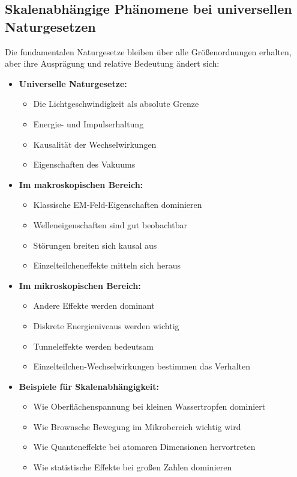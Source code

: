 \documentclass[12pt,a4paper]{article}
\begin{document}
	\subsection{Skalenabhängige Phänomene bei universellen Naturgesetzen}
	
	Die fundamentalen Naturgesetze bleiben über alle Größenordnungen erhalten, aber ihre Ausprägung und relative Bedeutung ändert sich:
	
	\begin{itemize}
		\item \textbf{Universelle Naturgesetze:}
		\begin{itemize}
			\item Die Lichtgeschwindigkeit als absolute Grenze
			\item Energie- und Impulserhaltung
			\item Kausalität der Wechselwirkungen
			\item Eigenschaften des Vakuums
		\end{itemize}
		
		\item \textbf{Im makroskopischen Bereich:}
		\begin{itemize}
			\item Klassische EM-Feld-Eigenschaften dominieren
			\item Welleneigenschaften sind gut beobachtbar
			\item Störungen breiten sich kausal aus
			\item Einzelteilcheneffekte mitteln sich heraus
		\end{itemize}
		
		\item \textbf{Im mikroskopischen Bereich:}
		\begin{itemize}
			\item Andere Effekte werden dominant
			\item Diskrete Energieniveaus werden wichtig
			\item Tunneleffekte werden bedeutsam
			\item Einzelteilchen-Wechselwirkungen bestimmen das Verhalten
		\end{itemize}
		
		\item \textbf{Beispiele für Skalenabhängigkeit:}
		\begin{itemize}
			\item Wie Oberflächenspannung bei kleinen Wassertropfen dominiert
			\item Wie Brownsche Bewegung im Mikrobereich wichtig wird
			\item Wie Quanteneffekte bei atomaren Dimensionen hervortreten
			\item Wie statistische Effekte bei großen Zahlen dominieren
		\end{itemize}
	\end{itemize}
	
\end{document}

